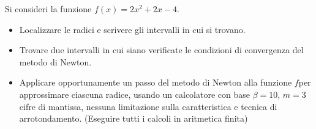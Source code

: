 Si consideri la funzione $f(x)=2x^2+2x-4$.
\begin{itemize}
\item  Localizzare le radici e
scrivere gli intervalli in cui si trovano.
\item Trovare due intervalli in cui siano verificate le condizioni di convergenza del metodo di Newton.
\item Applicare opportunamente un passo del metodo di Newton alla funzione
$f$per approssimare ciascuna radice, usando un calcolatore con
base $\beta =10$, $m=3$ cifre di mantissa, nessuna limitazione
sulla caratteristica e tecnica di arrotondamento. (Eseguire tutti
i calcoli in aritmetica finita)

\end{itemize}
